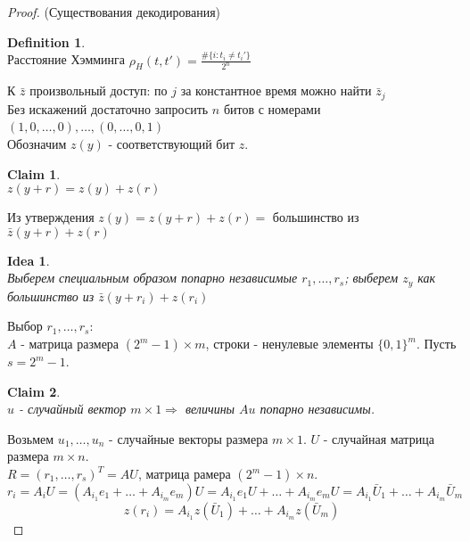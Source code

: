 \documentclass[a4paper]{article}
\theoremstyle{definition}
\newtheorem{definition}{Definition}
\theoremstyle{plain}
\newtheorem{claim}{Claim}
\newtheorem{idea}{Idea}
\begin{document}
\begin{proof}(Существования декодирования)~\\
	\begin{definition}~\\
		Расстояние Хэмминга $\rho_H(t, t') = \frac{\#\{i\colon t_i \ne t_i'\}}{2^n}$
	\end{definition}

	\noindent К $\bar{z}$ произвольный доступ: по $j$ за константное время можно найти $\bar{z}_j$~\\

	\noindent Без искажений достаточно запросить $n$ битов с номерами
	$(1, 0, \ldots, 0), \ldots, (0, \ldots, 0, 1)$~\\

	\noindent Обозначим $z(y)$ - соответствующий бит $z$.

	\begin{claim}~\\
		$z(y + r) = z(y) + z(r)$
	\end{claim}

	\noindent Из утверждения $z(y) = z(y + r) + z(r) = $ большинство из $\bar{z}(y + r) + z(r)$ 

	\begin{idea}~\\
		Выберем специальным образом попарно независимые $r_1, \ldots, r_s$; выберем $z_y$ как большинство
		из $\bar{z}(y + r_i) + z(r_i)$
	\end{idea}
	
	\noindent Выбор $r_1, \ldots, r_s$:~\\
	
	\noindent $A$ - матрица размера $(2^m - 1)\times m$, строки - ненулевые элементы $\{0, 1\}^m$.
	Пусть $s = 2^m - 1$.~\\
	
	\begin{claim}~\\
		$u$ - случайный вектор $m\times 1 \Rightarrow$ величины $Au$ попарно независимы.
	\end{claim}
	
	\noindent Возьмем $u_1, \ldots, u_n$ - случайные векторы размера $m \times 1$.
	$U$ - случайная матрица размера $m \times n$.~\\
	
	\noindent $R = (r_1, \ldots, r_s)^T = AU$, матрица рамера $(2^m - 1)\times n$.~\\
	$$
		r_i = A_iU = (A_{i_1}e_1 + \ldots + A_{i_m}e_m)U = 
		A_{i_1}e_1U + \ldots + A_{i_m}e_mU = A_{i_1}\bar{U}_1 + \ldots + A_{i_m}\bar{U}_m
	$$
	$$
		z(r_i) = A_{i_1}z(\bar{U}_1) + \ldots + A_{i_m}z(\bar{U}_m)	
	$$
	

\end{proof}
\end{document}
